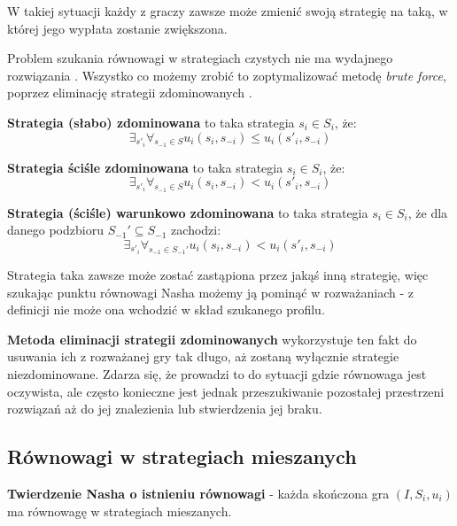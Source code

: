 \documentclass[polish]{standalone}
\begin{document}
W takiej sytuacji każdy z graczy zawsze może zmienić swoją strategię na taką, w której jego wypłata zostanie zwiększona.

Problem szukania równowagi w strategiach czystych nie ma wydajnego rozwiązania \cite[str.~16]{FT-GT}. Wszystko co
możemy zrobić to zoptymalizować metodę \textit{brute force}, poprzez eliminację strategii zdominowanych
\cite[str.~9--11]{FT-GT}.

\begin{definition}
\textbf{Strategia (słabo) zdominowana} to taka strategia $s_i \in S_i$, że:
$$\exists_{s'_i} \forall_{s_{-1} \in S} u_i(s_i, s_{-i}) \leq u_i(s'_i, s_{-i})$$
\cite[str.~6--7]{FT-GT}
\end{definition}

\begin{definition}
\textbf{Strategia ściśle zdominowana} to taka strategia $s_i \in S_i$, że:
$$\exists_{s'_i} \forall_{s_{-1} \in S} u_i(s_i, s_{-i}) < u_i(s'_i, s_{-i})$$
\cite[str.~6--7]{FT-GT}
\end{definition}

\begin{definition}
\textbf{Strategia (ściśle) warunkowo zdominowana} to taka strategia $s_i \in S_i$, że dla danego podzbioru $S_{-1}'
\subseteq S_{-1}$ zachodzi:
$$\exists_{s'_i} \forall_{s_{-1} \in S_{-1}'} u_i(s_i, s_{-i}) < u_i(s'_i, s_{-i})$$
\cite[str.~2]{PNS-NE}
\end{definition}

Strategia taka zawsze może zostać zastąpiona przez jakąś inną strategię, więc szukając punktu równowagi Nasha możemy ją
pominąć w rozważaniach - z definicji nie może ona wchodzić w skład szukanego profilu.

\textbf{Metoda eliminacji strategii zdominowanych} wykorzystuje ten fakt do usuwania ich z rozważanej gry tak długo, aż
zostaną wyłącznie strategie niezdominowane. Zdarza się, że prowadzi to do sytuacji gdzie równowaga jest oczywista, ale
często konieczne jest jednak przeszukiwanie pozostałej przestrzeni rozwiązań aż do jej znalezienia lub stwierdzenia jej
braku.

\subsection{Równowagi w strategiach mieszanych}

\begin{theorem}
\textbf{Twierdzenie Nasha o istnieniu równowagi} - każda skończona gra $(I, S_i, u_i)$ ma równowagę w strategiach
mieszanych.
\cite[str.~29]{FT-GT}
\end{theorem}
\end{document}
